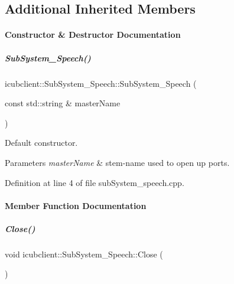 \subsection*{Additional Inherited Members}


\paragraph{Constructor \& Destructor Documentation}
\mbox{\label{group__icubclient__subsystems_a5a699b6d31d50fec18e5e63adecf5c96}} 
\subparagraph{\texorpdfstring{Sub\+System\+\_\+\+Speech()}{SubSystem\_Speech()}}
{\footnotesize\ttfamily icubclient\+::\+Sub\+System\+\_\+\+Speech\+::\+Sub\+System\+\_\+\+Speech (\begin{DoxyParamCaption}\item[{const std\+::string \&}]{master\+Name }\end{DoxyParamCaption})}



Default constructor. 


\begin{DoxyParams}{Parameters}
{\em master\+Name} & stem-\/name used to open up ports. \\
\hline
\end{DoxyParams}


Definition at line 4 of file sub\+System\+\_\+speech.\+cpp.



\paragraph{Member Function Documentation}
\mbox{\label{group__icubclient__subsystems_a12a3920b40dbabaf9eb7d14d81c172da}} 
\subparagraph{\texorpdfstring{Close()}{Close()}}
{\footnotesize\ttfamily void icubclient\+::\+Sub\+System\+\_\+\+Speech\+::\+Close (\begin{DoxyParamCaption}{ }\end{DoxyParamCaption})\hspace{0.3cm}{\ttfamily [virtual]}}



